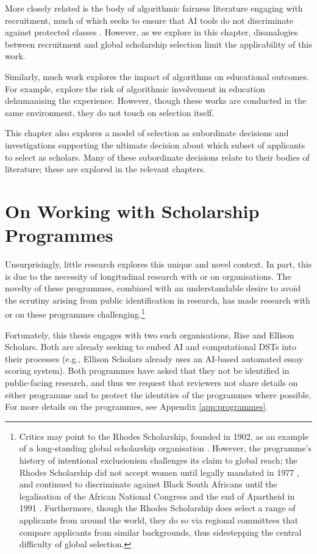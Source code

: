More closely related is the body of algorithmic fairness literature engaging with recruitment, much of which seeks to ensure that AI tools do not discriminate against protected classes \cite{dwork_fairness_2012}. However, as we explore in this chapter, disanalogies between recruitment and global scholarship selection limit the applicability of this work.

Similarly, much work explores the impact of algorithms on educational outcomes. For example, \textcite{NISSENBAUM1998237} explore the risk of algorithmic involvement in education dehumanising the experience. However, though these works are conducted in the same environment, they do not touch on selection itself.

This chapter also explores a model of selection as subordinate decisions and investigations supporting the ultimate decision about which subset of applicants to select as scholars. Many of these subordinate decisions relate to their bodies of literature; these are explored in the relevant chapters.

\section{On Working with Scholarship Programmes}
Unsurprisingly, little research explores this unique and novel context. In part, this is due to the necessity of longitudinal research with or on organisations. The novelty of these programmes, combined with an understandable desire to avoid the scrutiny arising from public identification in research, has made research with or on these programmes challenging.\footnote{Critics may point to the Rhodes Scholarship, founded in 1902, as an example of a long-standing global scholarship organisation \cite{Ziegler_2008}. However, the programme's history of intentional exclusionism challenges its claim to global reach; the Rhodes Scholarship did not accept women until legally mandated in 1977 \cite{Ziegler_2008}, and continued to discriminate against Black South Africans until the legalisation of the African National Congress and the end of Apartheid in 1991 \cite{Ziegler_2008}. Furthermore, though the Rhodes Scholarship does select a range of applicants from around the world, they do so via regional committees that compare applicants from similar backgrounds, thus sidestepping the central difficulty of global selection.}

Fortunately, this thesis engages with two such organisations, Rise and Ellison Scholars. Both are already seeking to embed AI and computational DSTs into their processes (e.g., Ellison Scholars already uses an AI-based automated essay scoring system). Both programmes have asked that they not be identified in public-facing research, and thus we request that reviewers not share details on either programme and to protect the identities of the programmes where possible. For more details on the programmes, see Appendix \ref{app:programmes}.

